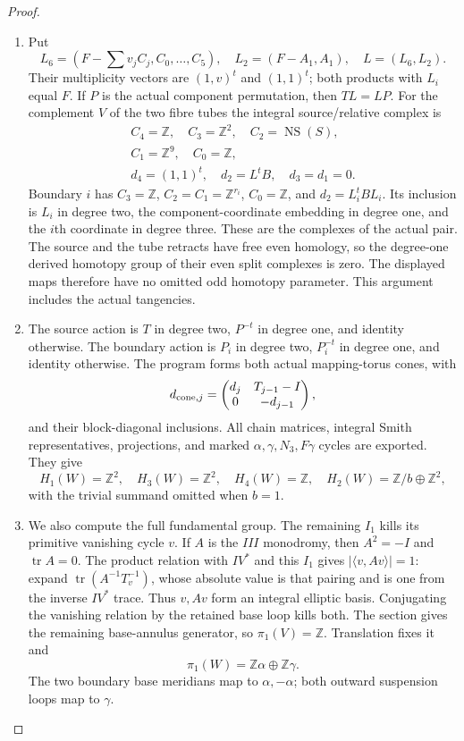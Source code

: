 \begin{proof}
\begin{enumerate}[label=\arabic*.]
\item Put
\[
 L_6=(F-\textstyle\sum v_jC_j,C_0,\ldots,C_5),\quad
 L_2=(F-A_1,A_1),\quad L=(L_6,L_2).
\]
Their multiplicity vectors are $(1,v)^t$ and $(1,1)^t$;
both products with $L_i$ equal $F$. If $P$ is the actual
component permutation, then $TL=LP$.
For the complement $V$ of the two fibre tubes the integral
source/relative complex is
\[
\begin{gathered}
 C_4=\mathbb Z,\quad C_3=\mathbb Z^2,\quad C_2=\operatorname{NS}(S),\\
 C_1=\mathbb Z^9,\quad C_0=\mathbb Z,\\
 d_4=(1,1)^t,\quad d_2=L^tB,\quad d_3=d_1=0.
\end{gathered}                  \tag{F46.13}
\]
Boundary $i$ has $C_3=\mathbb Z$, $C_2=C_1=\mathbb Z^{r_i}$,
$C_0=\mathbb Z$, and $d_2=L_i^tBL_i$.
Its inclusion is $L_i$ in degree two, the component-coordinate
embedding in degree one, and the $i$th coordinate in degree
three. These are the complexes of the actual pair. The source
and the tube retracts have free even homology, so the degree-one
derived homotopy group of their even split complexes is zero.
The displayed maps therefore have no omitted odd homotopy
parameter. This argument includes the actual tangencies.

\item The source action is $T$ in degree two, $P^{-t}$ in degree one,
and identity otherwise. The boundary action is $P_i$ in degree
two, $P_i^{-t}$ in degree one, and identity otherwise.
The program forms both actual mapping-torus cones, with
\[
       d_{{\rm cone},j}=
       \begin{pmatrix}d_j&T_{j-1}-I\\0&-d_{j-1}\end{pmatrix},
\]
and their block-diagonal inclusions. All chain matrices,
integral Smith representatives, projections, and marked
$\alpha,\gamma,N_3,F\gamma$ cycles are exported. They give
\[
 H_1(W)=\mathbb Z^2,\quad H_3(W)=\mathbb Z^2,\quad
 H_4(W)=\mathbb Z,\quad
 H_2(W)=\mathbb Z/b\oplus\mathbb Z^2,                           \tag{F46.14}
\]
with the trivial summand omitted when $b=1$.

\item We also compute the full fundamental group. The remaining
$I_1$ kills its primitive vanishing cycle $v$. If $A$ is the
$III$ monodromy, then $A^2=-I$ and $\operatorname{tr}A=0$.
The product relation with $IV^*$ and this $I_1$ gives
$|\langle v,Av\rangle|=1$: expand
$\operatorname{tr}(A^{-1}T_v^{-1})$, whose absolute value is
that pairing and is one from the inverse $IV^*$ trace.
Thus $v,Av$ form an integral elliptic basis. Conjugating the
vanishing relation by the retained base loop kills both.
The section gives the remaining base-annulus generator, so
$\pi_1(V)=\mathbb Z$. Translation fixes it and
\[
             \pi_1(W)=\mathbb Z\alpha\oplus\mathbb Z\gamma.
\]
The two boundary base meridians map to $\alpha,-\alpha$;
both outward suspension loops map to $\gamma$.


\end{enumerate}
\end{proof}
